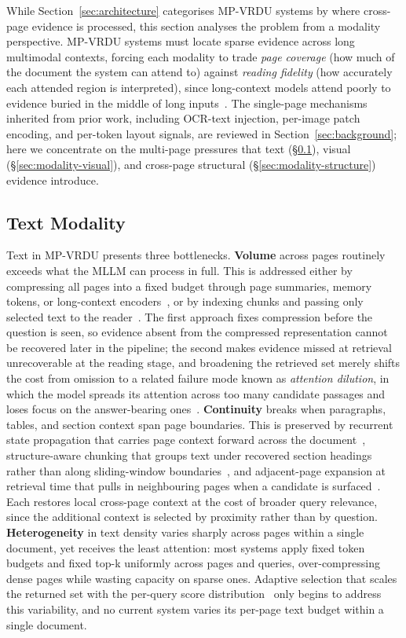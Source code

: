 \documentclass[11pt]{article}
\begin{document}
While Section~\ref{sec:architecture} categorises MP-VRDU systems by where cross-page evidence is processed, this section analyses the problem from a modality perspective. MP-VRDU systems must locate sparse evidence across long multimodal contexts, forcing each modality to trade \emph{page coverage} (how much of the document the system can attend to) against \emph{reading fidelity} (how accurately each attended region is interpreted), since long-context models attend poorly to evidence buried in the middle of long inputs~\cite{liu2024lost}. The single-page mechanisms inherited from prior work, including OCR-text injection, per-image patch encoding, and per-token layout signals, are reviewed in Section~\ref{sec:background}; here we concentrate on the multi-page pressures that text (\S\ref{sec:modality-text}), visual (\S\ref{sec:modality-visual}), and cross-page structural (\S\ref{sec:modality-structure}) evidence introduce.

\subsection{Text Modality}
\label{sec:modality-text}Text in MP-VRDU presents three bottlenecks. \textbf{Volume} across pages routinely exceeds what the MLLM can process in full. This is addressed either by compressing all pages into a fixed budget through page summaries, memory tokens, or long-context encoders~\cite{borchmann2025arctictilt,dong2024multipage,hu2025mplugdocowl2}, or by indexing chunks and passing only selected text to the reader~\cite{xie2024wukong,zhang2024cream,cho2024m3docrag}. The first approach fixes compression before the question is seen, so evidence absent from the compressed representation cannot be recovered later in the pipeline; the second makes evidence missed at retrieval unrecoverable at the reading stage, and broadening the retrieved set merely shifts the cost from omission to a related failure mode known as \emph{attention dilution}, in which the model spreads its attention across too many candidate passages and loses focus on the answer-bearing ones~\cite{liu2024lost}. \textbf{Continuity} breaks when paragraphs, tables, and section context span page boundaries. This is preserved by recurrent state propagation that carries page context forward across the document~\cite{dong2024multipage}, structure-aware chunking that groups text under recovered section headings rather than along sliding-window boundaries~\cite{shin2025multidocfusion}, and adjacent-page expansion at retrieval time that pulls in neighbouring pages when a candidate is surfaced~\cite{qian2026accurate}. Each restores local cross-page context at the cost of broader query relevance, since the additional context is selected by proximity rather than by question. \textbf{Heterogeneity} in text density varies sharply across pages within a single document, yet receives the least attention: most systems apply fixed token budgets and fixed top-k uniformly across pages and queries, over-compressing dense pages while wasting capacity on sparse ones. Adaptive selection that scales the returned set with the per-query score distribution~\cite{li2025avir} only begins to address this variability, and no current system varies its per-page text budget within a single document.
\end{document}
